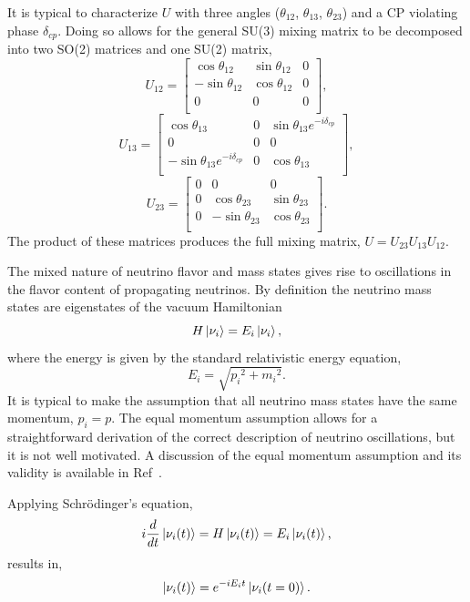 It is typical to characterize $U$ with three angles
($\theta_{12}$, $\theta_{13}$, $\theta_{23}$) and a CP violating
phase $\delta_{cp}$. Doing so allows for the general SU(3) mixing matrix to
be decomposed into two SO(2) matrices and one SU(2) matrix,
$$U_{12} =
\begin{bmatrix}
    \cos\theta_{12} & \sin\theta_{12} & 0  \\
    -\sin\theta_{12}& \cos\theta_{12} & 0  \\
    0 & 0 & 0  \\
\end{bmatrix},
$$
$$
U_{13} =
\begin{bmatrix}
    \cos\theta_{13} & 0 & \sin\theta_{13}e^{-i\delta_{cp}}\\
    0 & 0 & 0  \\
    -\sin\theta_{13} e^{-i\delta_{cp}} & 0 & \cos\theta_{13}  \\
\end{bmatrix},
$$
$$
U_{23} =
\begin{bmatrix}
    0 & 0 & 0  \\
    0 & \cos\theta_{23} & \sin\theta_{23} \\
    0 & -\sin\theta_{23} & \cos\theta_{23}   \\
\end{bmatrix}.
$$
The product of these matrices produces the full mixing matrix,
$U = U_{23}U_{13}U_{12}$.

The mixed nature of neutrino flavor and mass states gives rise to oscillations
in the flavor content of propagating neutrinos.
By definition the neutrino mass states are eigenstates of the vacuum Hamiltonian
\begin{equation}
    H\ket{\nu_{i}} = E_{i}\ket{\nu_{i}}\text{,}
\end{equation}
where the energy is given by the standard relativistic energy equation,
\begin{equation}
    E_{i} = \sqrt{{p_{i}}^{2} + {m_{i}}^2}\text{.}
\end{equation}
It is typical to make the assumption that all neutrino mass states have the same
momentum, $p_{i} = p$.
The equal momentum assumption allows for a straightforward derivation of the
correct description of neutrino oscillations, but it is not well motivated.
A discussion of the equal momentum assumption and its validity
is available in Ref~\citep{neutrino_osc_subtleties}.

Applying Schr\"{o}dinger's equation,
\begin{equation}
    i\frac{d}{dt}\ket{\nu_{i}(t)} = H\ket{\nu_{i}(t)} = E_{i}\ket{\nu_{i}(t)}\text{,}
\label{eq:mass_state_evolution}
\end{equation}
results in,
\begin{equation}
    \ket{\nu_{i}(t)} = e^{-iE_{i}t}\ket{\nu_{i}(t=0)}\text{.}
    \label{eqn:mass_state_tevol}
\end{equation}

